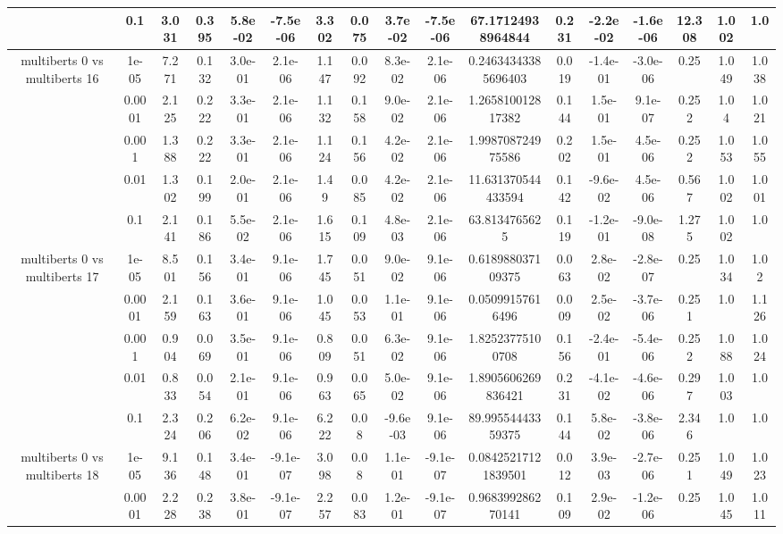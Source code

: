 \begin{tabular}{|c|c|c|c|c|c|c|c|c|c|c|c|c|c|c|c|c|}
 & 0.1 & 3.031 & 0.395 & 5.8e-02 & -7.5e-06 & 3.302 & 0.075 & 3.7e-02 & -7.5e-06 & 67.17124938964844 & 0.231 & -2.2e-02 & -1.6e-06 & 12.308 & 1.002 & 1.0 \\
\hline
\multirow{5}{*}{multiberts 0 vs multiberts 16} & 1e-05 & 7.271 & 0.132 & 3.0e-01 & 2.1e-06 & 1.147 & 0.092 & 8.3e-02 & 2.1e-06 & 0.24634343385696403 & 0.019 & -1.4e-01 & -3.0e-06 & 0.25 & 1.049 & 1.038 \\
 & 0.0001 & 2.125 & 0.222 & 3.3e-01 & 2.1e-06 & 1.132 & 0.158 & 9.0e-02 & 2.1e-06 & 1.265810012817382 & 0.144 & 1.5e-01 & 9.1e-07 & 0.252 & 1.04 & 1.021 \\
 & 0.001 & 1.388 & 0.222 & 3.3e-01 & 2.1e-06 & 1.124 & 0.156 & 4.2e-02 & 2.1e-06 & 1.998708724975586 & 0.202 & 1.5e-01 & 4.5e-06 & 0.252 & 1.053 & 1.055 \\
 & 0.01 & 1.302 & 0.199 & 2.0e-01 & 2.1e-06 & 1.49 & 0.085 & 4.2e-02 & 2.1e-06 & 11.631370544433594 & 0.142 & -9.6e-02 & 4.5e-06 & 0.567 & 1.002 & 1.001 \\
 & 0.1 & 2.141 & 0.186 & 5.5e-02 & 2.1e-06 & 1.615 & 0.109 & 4.8e-03 & 2.1e-06 & 63.8134765625 & 0.119 & -1.2e-01 & -9.0e-08 & 1.275 & 1.002 & 1.0 \\
\hline
\multirow{5}{*}{multiberts 0 vs multiberts 17} & 1e-05 & 8.501 & 0.156 & 3.4e-01 & 9.1e-06 & 1.745 & 0.051 & 9.0e-02 & 9.1e-06 & 0.618988037109375 & 0.063 & 2.8e-02 & -2.8e-07 & 0.25 & 1.034 & 1.02 \\
 & 0.0001 & 2.159 & 0.163 & 3.6e-01 & 9.1e-06 & 1.045 & 0.053 & 1.1e-01 & 9.1e-06 & 0.05099157616496 & 0.009 & 2.5e-02 & -3.7e-06 & 0.251 & 1.0 & 1.126 \\
 & 0.001 & 0.904 & 0.069 & 3.5e-01 & 9.1e-06 & 0.809 & 0.051 & 6.3e-02 & 9.1e-06 & 1.82523775100708 & 0.156 & -2.4e-01 & -5.4e-06 & 0.252 & 1.088 & 1.024 \\
 & 0.01 & 0.833 & 0.054 & 2.1e-01 & 9.1e-06 & 0.963 & 0.065 & 5.0e-02 & 9.1e-06 & 1.8905606269836421 & 0.231 & -4.1e-02 & -4.6e-06 & 0.297 & 1.003 & 1.0 \\
 & 0.1 & 2.324 & 0.206 & 6.2e-02 & 9.1e-06 & 6.222 & 0.08 & -9.6e-03 & 9.1e-06 & 89.99554443359375 & 0.144 & 5.8e-02 & -3.8e-06 & 2.346 & 1.0 & 1.0 \\
\hline
\multirow{5}{*}{multiberts 0 vs multiberts 18} & 1e-05 & 9.136 & 0.148 & 3.4e-01 & -9.1e-07 & 3.098 & 0.08 & 1.1e-01 & -9.1e-07 & 0.08425217121839501 & 0.012 & 3.9e-03 & -2.7e-06 & 0.251 & 1.049 & 1.023 \\
 & 0.0001 & 2.228 & 0.238 & 3.8e-01 & -9.1e-07 & 2.257 & 0.083 & 1.2e-01 & -9.1e-07 & 0.968399286270141 & 0.109 & 2.9e-02 & -1.2e-06 & 0.25 & 1.045 & 1.011 \\

\end{tabular}
